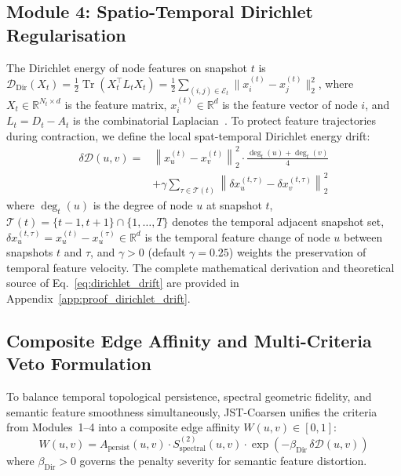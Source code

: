 \documentclass[sigconf]{acmart}
\begin{document}
\subsection{Module 4: Spatio-Temporal Dirichlet Regularisation}
\label{sec:module4}
The Dirichlet energy of node features on snapshot $t$ is $\mathcal{D}_{\text{Dir}}(X_t) = \frac{1}{2} \operatorname{Tr}(X_t^\top L_t X_t) = \frac{1}{2}\sum_{(i, j) \in \mathcal{E}_t} \|x_i^{(t)} - x_j^{(t)}\|_2^2$, where $X_t \in \mathbb{R}^{N_t \times d}$ is the feature matrix, $x_i^{(t)} \in \mathbb{R}^d$ is the feature vector of node $i$, and $L_t = D_t - A_t$ is the combinatorial Laplacian~\cite{chamberlain2021grand,rusch2023survey}. To protect feature trajectories during contraction, we define the local spat-temporal Dirichlet energy drift:
\begin{equation}
\label{eq:dirichlet_drift}
\begin{split}
\delta \mathcal{D}(u, v) = {}& \left\|x_u^{(t)} - x_v^{(t)}\right\|_2^2 \cdot \frac{\operatorname{deg}_t(u) + \operatorname{deg}_t(v)}{4} \\
& + \gamma \sum_{\tau \in \mathcal{T}(t)} \left\|\delta x_u^{(t, \tau)} - \delta x_v^{(t, \tau)}\right\|_2^2
\end{split}
\end{equation}
where $\operatorname{deg}_t(u)$ is the degree of node $u$ at snapshot $t$, $\mathcal{T}(t) = \{t - 1, t + 1\} \cap \{1, \dots, T\}$ denotes the temporal adjacent snapshot set, $\delta x_u^{(t, \tau)} = x_u^{(t)} - x_u^{(\tau)} \in \mathbb{R}^d$ is the temporal feature change of node $u$ between snapshots $t$ and $\tau$, and $\gamma > 0$ (default $\gamma = 0.25$) weights the preservation of temporal feature velocity. The complete mathematical derivation and theoretical source of Eq.~\eqref{eq:dirichlet_drift} are provided in Appendix~\ref{app:proof_dirichlet_drift}.

\subsection{Composite Edge Affinity and Multi-Criteria Veto Formulation}
\label{sec:fusion}
To balance temporal topological persistence, spectral geometric fidelity, and semantic feature smoothness simultaneously, JST-Coarsen unifies the criteria from Modules~1--4 into a composite edge affinity $W(u, v) \in [0, 1]$:
\begin{equation}
\label{eq:composite_affinity}
W(u, v) = A_{\text{persist}}(u, v) \cdot S_{\text{spectral}}^{(2)}(u, v) \cdot \exp\left(-\beta_{\text{Dir}} \, \delta \mathcal{D}(u, v)\right)
\end{equation}
where $\beta_{\text{Dir}} > 0$ governs the penalty severity for semantic feature distortion.
\end{document}
